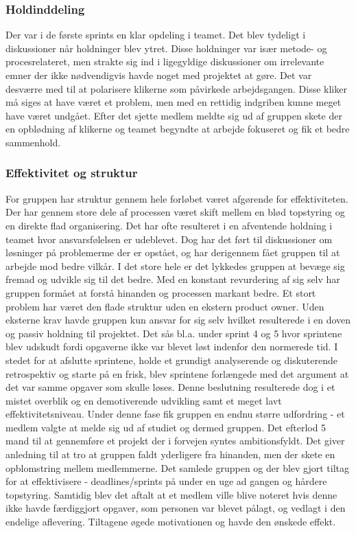 \subsubsection{Holdinddeling}
Der var i de første sprints en klar opdeling i teamet. Det blev tydeligt i diskussioner når holdninger blev ytret. Disse holdninger var især metode- og procesrelateret, men strakte 
sig ind i ligegyldige diskussioner om irrelevante emner der ikke nødvendigvis havde noget med projektet at gøre. Det var desværre med til at polarisere klikerne som påvirkede 
arbejdsgangen. Disse kliker må siges at have været et problem, men med en rettidig indgriben kunne meget have været undgået. Efter det sjette medlem meldte sig ud af gruppen 
skete der en opblødning af klikerne og teamet begyndte at arbejde fokuseret og fik et bedre sammenhold.

\subsubsection{Effektivitet og struktur}
For gruppen har struktur gennem hele forløbet været afgørende for effektiviteten. Der har gennem store dele af processen været skift mellem en blød topstyring og en direkte
flad organisering. Det har ofte resulteret i en afventende holdning i teamet hvor ansvarsfølelsen er udeblevet. Dog har det ført til diskussioner om løsninger på problemerme der 
er opstået, og har derigennem fået gruppen til at arbejde mod bedre vilkår. I det store hele er det lykkedes gruppen at bevæge sig fremad og udvikle sig til det bedre. 
Med en konstant revurdering af sig selv har gruppen formået at forstå hinanden og processen markant bedre.
Et stort problem har været den flade struktur uden en ekstern product owner. Uden eksterne krav havde gruppen kun ansvar for sig selv hvilket resulterede i en doven og passiv 
holdning til projektet. Det sås bl.a. under sprint 4 og 5 hvor sprintene blev udskudt fordi opgaverne ikke var blevet løst indenfor den normerede tid. I stedet for at afslutte 
sprintene, holde et grundigt analyserende og diskuterende retrospektiv og starte på en frisk, blev sprintene forlængede med det argument at det var samme opgaver som skulle løses. 
Denne beslutning resulterede dog i et mistet overblik og en demotiverende udvikling samt et meget lavt effektivitetsniveau. 
Under denne fase fik gruppen en endnu større udfordring - et medlem valgte at melde sig ud af studiet og dermed gruppen. Det efterlod 5 mand til at gennemføre et projekt der i 
forvejen syntes ambitionsfyldt. Det giver anledning til at tro at gruppen faldt yderligere fra hinanden, men der skete en opblomstring mellem medlemmerne. Det samlede gruppen og 
der blev gjort tiltag for at effektivisere - deadlines/sprints på under en uge ad gangen og hårdere topstyring. Samtidig blev det aftalt at et medlem ville blive noteret hvis 
denne ikke havde færdiggjort opgaver, som personen var blevet pålagt, og vedlagt i den endelige aflevering. Tiltagene øgede motivationen og havde den ønskede effekt.


